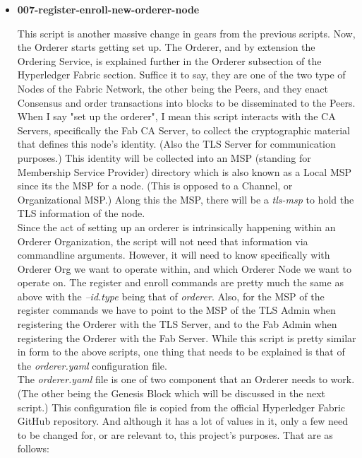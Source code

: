 \begin{itemize}
				\item \textbf{007-register-enroll-new-orderer-node}
				
					\hspace{10mm}This script is another massive change in gears from the previous scripts. Now, the Orderer starts getting set up. The Orderer, and by extension the Ordering Service, is explained further in the Orderer subsection of the Hyperledger Fabric section. Suffice it to say, they are one of the two type of Nodes of the Fabric Network, the other being the Peers, and they enact Consensus and order transactions into blocks to be disseminated to the Peers. When I say "set up the orderer", I mean this script interacts with the CA Servers, specifically the Fab CA Server, to collect the cryptographic material that defines this node's identity. (Also the TLS Server for communication purposes.) This identity will be collected into an MSP (standing for Membership Service Provider) directory which is also known as a Local MSP since its the MSP for a node. (This is opposed to a Channel, or Organizational MSP.) Along this the MSP, there will be a \textit{tls-msp} to hold the TLS information of the node.\\
					
					\hspace{10mm}Since the act of setting up an orderer is intrinsically happening within an Orderer Organization, the script will not need that information via commandline arguments. However, it will need to know specifically with Orderer Org we want to operate within, and which Orderer Node we want to operate on. The register and enroll commands are pretty much the same as above with the \textit{--id.type} being that of \textit{orderer}. Also, for the MSP of the register commands we have to point to the MSP of the TLS Admin when registering the Orderer with the TLS Server, and to the Fab Admin when registering the Orderer with the Fab Server. While this script is pretty similar in form to the above scripts, one thing that needs to be explained is that of the \textit{orderer.yaml} configuration file.\\
					
					\hspace{10mm}The \textit{orderer.yaml} file is one of two component that an Orderer needs to work. (The other being the Genesis Block which will be discussed in the next script.) This configuration file is copied from the official Hyperledger Fabric GitHub repository. And although it has a lot of values in it, only a few need to be changed for, or are relevant to, this project's purposes. That are as follows:
					

\end{itemize}
